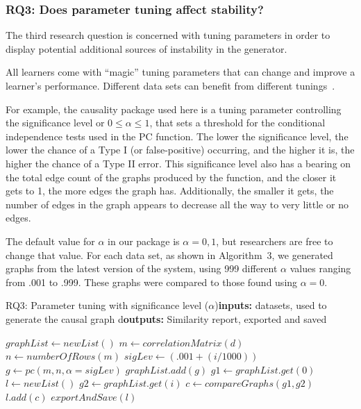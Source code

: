 \documentclass[]{svjour3}
\begin{document}
\subsubsection{RQ3: Does parameter tuning affect stability?}
The third research question is concerned with tuning parameters in order to display potential additional sources of instability in the generator.

All learners come with ``magic'' tuning parameters that can
change and improve a learner's performance. Different data
sets can benefit from different tunings~\cite{fu2016tuning}. 

For example, the causality package used here is a tuning
parameter controlling the significance level or \(0 \le \alpha \le 1\), that sets a threshold for the conditional independence tests used in the PC function.  The lower the significance level, the lower the chance of a Type I (or false-positive) occurring, and the higher it is, the higher the chance of a Type II error. This significance level also has a bearing on the total edge count of the graphs produced by the function, and the closer it gets to 1, the more edges the graph has.  Additionally, the smaller it gets, the number of edges in the graph appears to decrease all the way to very little or no edges.  

The default value for $\alpha$ in  our package is
$\alpha=0,1$, but researchers are free to change that value. For each data set, as shown in Algorithm~3,  we generated graphs from the latest version of the system, using  999 different 
$\alpha$ values ranging from  .001 to .999.  These graphs were compared to those found using $\alpha=0$.


\begin{algorithm}[h!tbp]
\footnotesize
    \caption{RQ3: Parameter tuning   with significance level (\(\alpha\))\newline\textbf{inputs: }datasets,  used to generate the causal graph d\newline\textbf{outputs: } Similarity report, exported and saved}
        
    \begin{algorithmic}[1]
            \State $graphList \leftarrow  newList()$
            \State $m \leftarrow correlationMatrix(d)$
            \State $n \leftarrow numberOfRows(m)$
                \State $sigLev \leftarrow (.001 + (i /1000))$
                \State $g \leftarrow pc(m, n, \alpha = sigLev)$
                \State $graphList.add(g)$
            \EndFor
            \State $g1 \leftarrow graphList.get(0)$ 
            \State $l \leftarrow newList()$
                \State $g2 \leftarrow graphList.get(i)$
                \State $c \leftarrow compareGraphs(g1, g2)$
                \State $l.add(c)$
            \EndFor
            \State $exportAndSave(l)$
        \EndFor
    \end{algorithmic}
\end{algorithm}
\end{document}
